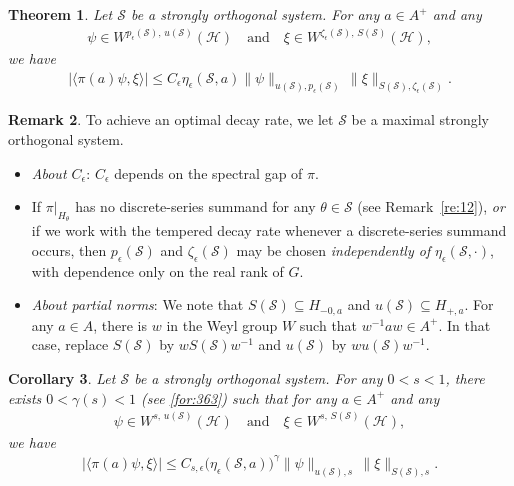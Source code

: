 \documentclass[11 pt]{amsart}
\newcommand{\norm}[1]{\lVert#1\rVert}
\newtheorem{theorem}{Theorem}[section]
\newtheorem{corollary}[theorem]{Corollary}
\theoremstyle{definition}
\newtheorem{remark}[theorem]{Remark}
\numberwithin{equation}{section}
\begin{document}
\begin{theorem}\label{th:7} Let $\mathcal{S}$ be a  strongly orthogonal system.  For any $a\in A^+$ and any
\begin{align*}
 \psi\in W^{p_\epsilon(\mathcal{S}),\, u(\mathcal{S})}(\mathcal{H})\quad\text{and}\quad \xi\in W^{\zeta_\epsilon(\mathcal{S}),\, S(\mathcal{S})}(\mathcal{H}),
\end{align*}
 we have
\begin{align*}
 \big|\langle \pi(a)\psi, \xi\rangle\big|\leq C_\epsilon \eta_\epsilon(\mathcal{S}, a)\norm{\psi}_{u(\mathcal{S}),p_{\epsilon}(\mathcal{S})}\,\big\|\xi\big\|_{S(\mathcal{S}),\zeta_{\epsilon}(\mathcal{S})}.
\end{align*}

\end{theorem}
\begin{remark}\label{re:7} To achieve an optimal decay rate, we let $\mathcal{S}$ be a maximal strongly orthogonal system.
\begin{itemize}

  \item \emph{About $C_\epsilon$}: $C_\epsilon$ depends on the spectral gap of $\pi$.

  \item If \(\pi|_{H_\theta}\) has no discrete-series summand for any \(\theta\in\mathcal S\)
(see Remark~\ref{re:12}), \emph{or} if we work with the tempered decay rate whenever a
discrete-series summand occurs, then \(p_{\epsilon}(\mathcal S)\) and
\(\zeta_{\epsilon}(\mathcal S)\) may be chosen \emph{independently of}
\(\eta_\epsilon(\mathcal S,\cdot)\), with dependence only on the real rank of \(G\).

  \item \emph{About partial norms}: We note that $S(\mathcal{S})\subseteq H_{-0,a}$ and $u(\mathcal{S})\subseteq H_{+,a}$. For any $a\in A$, there is $w$ in the Weyl group $W$ such that $w^{-1}aw\in A^+$. In that case, replace $S(\mathcal S)$ by $wS(\mathcal S)w^{-1}$ and $u(\mathcal S)$ by $wu(\mathcal S)w^{-1}$.
\end{itemize}










\end{remark}
\begin{corollary}\label{cor:9} Let $\mathcal{S}$ be a  strongly orthogonal system. For any  $0<s<1$, there exists $0<\gamma(s)<1$ (see \eqref{for:363}) such that for any $a\in A^+$ and any
\begin{align*}
 \psi\in W^{s,\, u(\mathcal{S})}(\mathcal{H})\quad\text{and}\quad \xi\in W^{s,\, S(\mathcal{S})}(\mathcal{H}),
\end{align*}
 we have
\begin{align*}
 \big|\langle \pi(a)\psi, \xi\rangle\big|\leq C_{s,\epsilon} \big(\eta_\epsilon(\mathcal{S}, a)\big)^{\gamma}\norm{\psi}_{u(\mathcal{S}),s}\,\big\|\xi\big\|_{S(\mathcal{S}),s}.
\end{align*}

\end{corollary}
\end{document}
